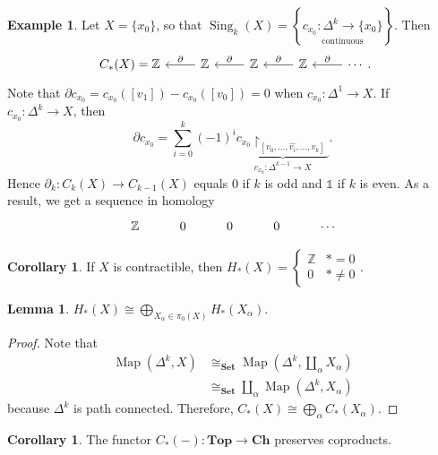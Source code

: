 \documentclass[10pt,letterpaper,cm]{nupset}
\theoremstyle{definition}
\newtheorem{exmp}[definition]{Example}
\theoremstyle{theorem}
\newtheorem{lemma}[definition]{Lemma}
\newtheorem{corollary}[definition]{Corollary}
\theoremstyle{remark}
\newcommand{\Z}{\mathbb Z}
\newcommand{\1}{\mathbb{1}}
\newcommand{\0}{\vec 0}
\DeclareMathOperator{\map}{Map}
\DeclareMathOperator{\sing}{Sing}
\begin{document}
\begin{exmp}
Let $X =\{x_0\}$, so that $\sing_k(X) = \left\{\underset{\text{continuous}}{c_{x_0} : \Delta^k \to \{x_0\}}\right\}$. Then
\[
\begin{tikzcd}
C_{\ast}(X) =  \Z & \Z \arrow[l, "\partial"'] & \Z \arrow[l, "\partial"'] & \Z \arrow[l, "\partial"'] & \cdots \arrow[l, "\partial"']
\end{tikzcd}.
\]  Note that $\partial{c_{x_0}} = c_{x_0}([v_1]) - c_{x_0}([v_0]) =0$ when $c_{x_0} : \Delta^1 \to X$. If $c_{x_0} : \Delta^k \to X$, then $$\partial{c_{x_0}} = \sum_{i=0}^k ({-1})^i \underbrace{c_{x_0}\restriction_{[v_0, \ldots, \hat{v_i}, \ldots, v_k]}}_{c_{x_0} : \Delta^{k-1} \to X}.$$ Hence $\partial_k : C_k(X) \to C_{k-1}(X)$ equals $0$ if $k$ is odd and $\1$ if $k$ is even. As a result, we get a sequence in homology 
\[
\begin{tikzcd}
\Z & 0 & 0 & 0 & \cdots
\end{tikzcd}
\]
\end{exmp}

\begin{corollary}
If $X$ is contractible, then $H_{\ast}(X) = \begin{cases} \Z & \ast =0 \\ 0 & \ast \ne 0 \end{cases}.$
\end{corollary}

\begin{lemma}
$H_{\ast}(X) \cong \bigoplus_{X_{\alpha} \in \pi_0(X)} H_{\ast}(X_{\alpha})$. 
\end{lemma}
\begin{proof} Note that
\begin{align*}
\map(\Delta^k, X) & \cong_{\mathbf{Set}} \map(\Delta^k, \coprod_{\alpha} X_{\alpha})
\\ & \cong_{\mathbf{Set}} \coprod_{\alpha} \map(\Delta^k, X_{\alpha})
\end{align*}
because $\Delta^k$ is path connected. Therefore, $C_{\ast}(X) \cong \bigoplus_{\alpha} C_{\ast}(X_{\alpha})$.
\end{proof}

\begin{corollary}
The functor $C_{\ast}(-) : \mathbf{Top} \to \mathbf{Ch}$ preserves coproducts. 
\end{corollary}
\end{document}

